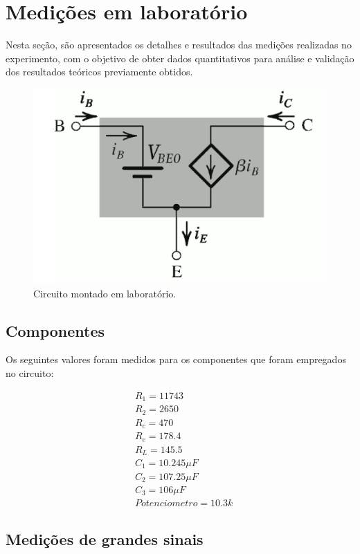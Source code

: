 \section{Medições em laboratório}

Nesta seção, são apresentados os detalhes e resultados das medições realizadas no experimento, com o objetivo de obter dados quantitativos para análise e validação dos resultados teóricos previamente obtidos.

\begin{figure}[H]
    \centering
    \includegraphics[width=0.5\columnwidth]{images/modelo_grandes_sinais.png}
    \caption{Circuito montado em laboratório.}
\end{figure}

\subsection{Componentes}

Os seguintes valores foram medidos para os componentes que foram empregados no circuito:

\begin{equation}
    \begin{aligned}
         & R_1 = 11743           \\
         & R_2 = 2650            \\
         & R_c = 470             \\
         & R_e = 178.4           \\
         & R_L = 145.5           \\
         & C_1 = 10.245 \mu F    \\
         & C_2 = 107.25 \mu F    \\
         & C_3 = 106 \mu F       \\
         & Potenciometro = 10.3k
    \end{aligned}
\end{equation}

\subsection{Medições de grandes sinais}

